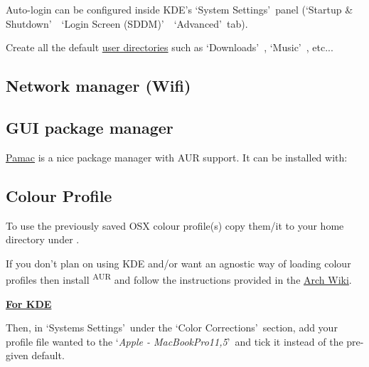 Auto-login can be configured inside KDE's \lq System Settings\rq\ panel (\lq Startup \& Shutdown\rq\ \rightarrow\ \lq Login Screen (SDDM)\rq\ \rightarrow\ \lq Advanced\rq\ tab).

\begin{blocksection}
	Create all the default \href{https://wiki.archlinux.org/index.php/XDG_user_directories}{user directories} such as \lq Downloads\rq\ , \lq Music\rq\  , etc...
\end{blocksection}

\subsection{Network manager (Wifi)}

\subsection{GUI package manager}

\href{https://wiki.manjaro.org/index.php?title=Pamac}{Pamac} is a nice package manager with AUR support. It can be installed with:


\subsection{Colour Profile}

To use the previously saved OSX colour profile(s) copy them/it to your home directory under . 

If you don't plan on using KDE and/or want an agnostic way of loading colour profiles then install \textsuperscript{AUR} and follow the instructions provided in the \href{https://wiki.archlinux.org/index.php/mac#Color_Profile}{Arch Wiki}.

\textbf{\textcolor{textgrey}{\uline{For KDE}}}

\begin{blocksection}
	Then, in \lq Systems Settings\rq\ under the \lq Color Corrections\rq\ section, add your profile file wanted to the \lq\textit{Apple - MacBookPro11,5}\rq\ and tick it instead of the pre-given default.
\end{blocksection}

